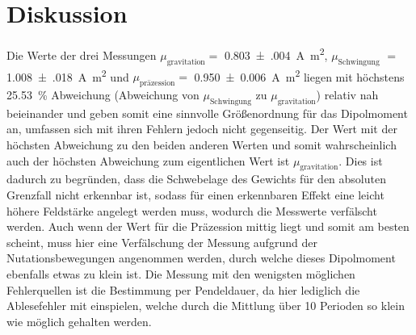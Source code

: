 \section{Diskussion}
\label{sec:Diskussion}

Die Werte der drei Messungen $\mu_\text{gravitation}=$ \SI{0.803(004)}{\ampere\square\meter}, $\mu_\text{Schwingung}$ $=$ \SI{1.008(018)}{\ampere\square\meter}
und $\mu_\text{präzession}=$ \SI{0.950(6)}{\ampere\square\meter} liegen mit höchstens \SI{25.53}{\percent} Abweichung (Abweichung von $\mu_\text{Schwingung}$ zu $\mu_\text{gravitation}$)
relativ nah beieinander und geben somit eine sinnvolle Größenordnung für das Dipolmoment an, umfassen sich mit ihren Fehlern jedoch nicht gegenseitig.
Der Wert mit der höchsten Abweichung zu den beiden anderen Werten und somit wahrscheinlich auch der höchsten Abweichung zum eigentlichen Wert ist $\mu_\text{gravitation}$.
Dies ist dadurch zu begründen, dass die Schwebelage des Gewichts für den absoluten Grenzfall nicht erkennbar ist, sodass für einen erkennbaren Effekt eine leicht höhere Feldstärke angelegt
werden muss, wodurch die Messwerte verfälscht werden. Auch wenn der Wert für die Präzession mittig liegt und somit am besten scheint, muss hier eine Verfälschung der Messung
aufgrund der Nutationsbewegungen angenommen werden, durch welche dieses Dipolmoment ebenfalls etwas zu klein ist. Die Messung mit den wenigsten
möglichen Fehlerquellen ist die Bestimmung per Pendeldauer, da hier lediglich die Ablesefehler mit einspielen, welche durch die Mittlung über 10 Perioden so klein wie
möglich gehalten werden.
